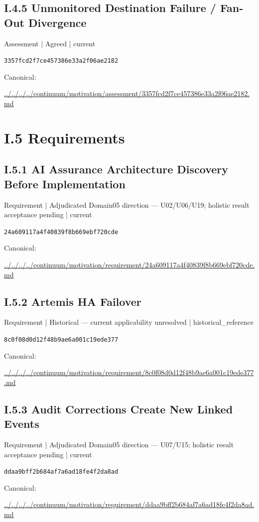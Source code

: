 \documentclass[10pt,a4paper]{article}
\begin{document}
\subsection*{I.4.5 Unmonitored Destination Failure / Fan-Out Divergence}
\label{element-3357fcd2f7ce457386e33a2f06ae2182}
{\small Assessment | Agreed | current}\par
\texttt{3357fcd2f7ce457386e33a2f06ae2182}\par
Canonical: \par
{\footnotesize\url{../../../../continuum/motivation/assessment/3357fcd2f7ce457386e33a2f06ae2182.md}}\par
\section*{I.5 Requirements}
\subsection*{I.5.1 AI Assurance Architecture Discovery Before Implementation}
\label{element-24a609117a4f40839f8b669ebf720cde}
{\small Requirement | Adjudicated Domain05 direction — U02/U06/U19; holistic result acceptance pending | current}\par
\texttt{24a609117a4f40839f8b669ebf720cde}\par
Canonical: \par
{\footnotesize\url{../../../../continuum/motivation/requirement/24a609117a4f40839f8b669ebf720cde.md}}\par
\subsection*{I.5.2 Artemis HA Failover}
\label{element-8c0f08d0d12f48b9ae6a001c19ede377}
{\small Requirement | Historical — current applicability unresolved | historical\_reference}\par
\texttt{8c0f08d0d12f48b9ae6a001c19ede377}\par
Canonical: \par
{\footnotesize\url{../../../../continuum/motivation/requirement/8c0f08d0d12f48b9ae6a001c19ede377.md}}\par
\subsection*{I.5.3 Audit Corrections Create New Linked Events}
\label{element-ddaa9bff2b684af7a6ad18fe4f2da8ad}
{\small Requirement | Adjudicated Domain05 direction — U07/U15; holistic result acceptance pending | current}\par
\texttt{ddaa9bff2b684af7a6ad18fe4f2da8ad}\par
Canonical: \par
{\footnotesize\url{../../../../continuum/motivation/requirement/ddaa9bff2b684af7a6ad18fe4f2da8ad.md}}\par
\end{document}
